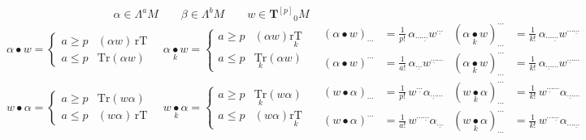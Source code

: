 \[
  \alpha\in\Lambda^aM \qquad \beta\in\Lambda^bM \qquad w\in\mathbf{T}^{[p]}{}_0M
\]
\[
  \alpha\bullet w = \begin{cases} a\geq p & (\alpha w)\,\mathrm{rT} \\ a\leq p & \mathrm{Tr}(\alpha w)\end{cases}
  \quad
  \alpha\underset{k}{\bullet}w = \begin{cases} a\geq p & (\alpha w)\underset{k}{\mathrm{rT}} \\ a\leq p & \underset{k}{\mathrm{Tr}}(\alpha w)\end{cases}
  \quad
  \begin{aligned}
    (\alpha\bullet w)_{\cdots} &= \tfrac1{p!}\,\alpha_{\cdots\underline{\cdots}}w^{\underline{\cdots}} &
    (\alpha\underset{k}{\bullet}w)^{\cdots}_{\cdots} &= \tfrac1{k!}\,\alpha_{\cdots\underline{\cdots}}w^{\cdots\underline{\cdots}} \\
    (\alpha\bullet w)^{\cdots} &= \tfrac1{a!}\,\alpha_{\underline{\cdots}}w^{\underline{\cdots}\cdots} &
    (\alpha\underset{k}{\bullet}w)^{\cdots}_{\cdots} &= \tfrac1{k!}\,\alpha_{\underline{\cdots}\cdots}w^{\underline{\cdots}\cdots}
  \end{aligned}
\]
\[
  w\bullet\alpha = \begin{cases} a\geq p & \mathrm{Tr}(w\alpha) \\ a\leq p & (w\alpha)\,\mathrm{rT}\end{cases}
  \quad
  w\underset{k}{\bullet}\alpha = \begin{cases} a\geq p & \underset{k}{\mathrm{Tr}}(w\alpha) \\ a\leq p & (w\alpha)\underset{k}{\mathrm{rT}}\end{cases}
  \quad
  \begin{aligned}
    (w\bullet\alpha)_{\cdots} &= \tfrac1{p!}\,w^{\underline{\cdots}}\alpha_{\underline{\cdots}\cdots} &
    (w\underset{k}{\bullet}\alpha)^{\cdots}_{\cdots} &= \tfrac1{k!}\,w^{\underline{\cdots}\cdots}\alpha_{\underline{\cdots}\cdots} \\
    (w\bullet\alpha)^{\cdots} &= \tfrac1{a!}\,w^{\cdots\underline{\cdots}}\alpha_{\underline{\cdots}} &
    (w\underset{k}{\bullet}\alpha)^{\cdots}_{\cdots} &= \tfrac1{k!}\,w^{\cdots\underline{\cdots}}\alpha_{\cdots\underline{\cdots}}
  \end{aligned}
\]

